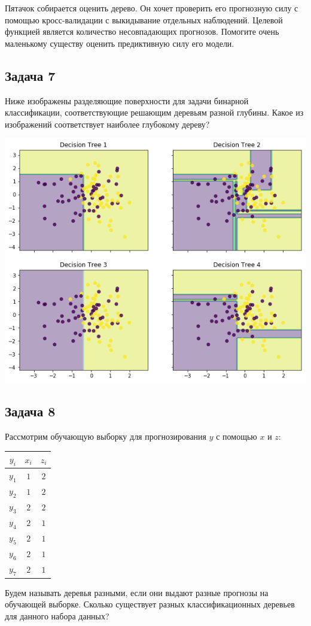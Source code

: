 \documentclass[12pt, a4paper, oneside]{article}
\begin{document}
Пятачок собирается оценить дерево. Он хочет проверить его прогнозную силу с помощью кросс-валидации с выкидывание отдельных  наблюдений. Целевой функцией является количество несовпадающих прогнозов. Помогите очень маленькому существу оценить предиктивную силу его модели.


\subsection*{Задача 7} 

Ниже изображены разделяющие поверхности для задачи бинарной классификации, соответствующие решающим деревьям разной глубины. Какое из изображений соответствует наиболее глубокому дереву?

\begin{center}
	\includegraphics[scale=0.7]{trees.png}
\end{center}


\subsection*{Задача 8} 

Рассмотрим обучающую выборку для прогнозирования $y$ с помощью $x$ и $z$:

\begin{center}
\begin{tabular}{c|c|c}
	$y_i$ & $x_i$ & $z_i$ \\
\hline
	$y_1$ & $1$ & $2$ \\
	$y_2$ & $1$ & $2$ \\
	$y_3$ & $2$ & $2$ \\
	$y_4$ & $2$ & $1$\\
	$y_5$ & $2$ & $1$ \\
	$y_6$ & $2$ & $1$ \\
	$y_7$ & $2$ & $1$ \\
\end{tabular}
\end{center}

Будем называть деревья разными, если они выдают разные прогнозы на обучающей выборке.
Сколько существует разных классификационных деревьев  для данного набора данных?
\end{document}
